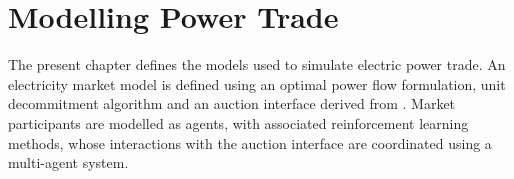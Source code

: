 \chapter{Modelling Power Trade}
\label{ch:method}
The present chapter defines the models used to simulate electric power trade.
An electricity market model is defined using an optimal power flow
formulation, unit decommitment algorithm and an auction interface derived from
\cite{zimmerman:mp_pes}.  Market participants are modelled as agents, with
associated reinforcement learning methods, whose interactions with the
auction interface are coordinated using a multi-agent system.

%
%
%
